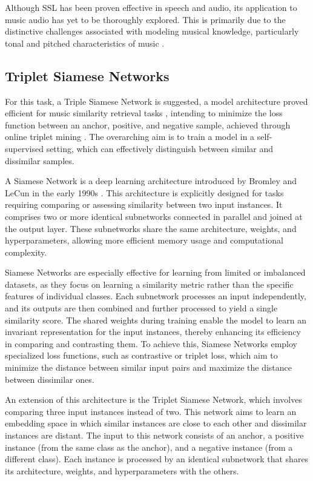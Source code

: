 Although SSL has been proven effective in speech and audio, its
application to music audio has yet to be thoroughly explored. This is primarily due
to the distinctive challenges associated with modeling musical knowledge, particularly tonal and pitched characteristics of music \cite{Li2023MERT:Training}.

\subsection{Triplet Siamese Networks}

For this task, a Triple Siamese Network is suggested, a model architecture proved efficient for music similarity retrieval tasks \cite{contentmusicsimtriplet2020}, intending to minimize the loss function between an anchor, positive, and negative sample, achieved through online triplet mining \cite{Sikaroudi2020OfflinePatches}. The overarching aim is to train a model in a self-supervised setting, which can effectively distinguish between similar and dissimilar samples. 

A Siamese Network is a deep learning architecture introduced by Bromley and LeCun in the early 1990s \cite{Bromley1993SignatureNetwork}. This architecture is explicitly designed for tasks requiring comparing or assessing similarity between two input instances. It comprises two or more identical subnetworks connected in parallel and joined at the output layer. These subnetworks share the same architecture, weights, and hyperparameters, allowing more efficient memory usage and computational complexity.

Siamese Networks are especially effective for learning from limited or imbalanced datasets, as they focus on learning a similarity metric rather than the specific features of individual classes. Each subnetwork processes an input independently, and its outputs are then combined and further processed to yield a single similarity score. The shared weights during training enable the model to learn an invariant representation for the input instances, thereby enhancing its efficiency in comparing and contrasting them. To achieve this, Siamese Networks employ specialized loss functions, such as contrastive or triplet loss, which aim to minimize the distance between similar input pairs and maximize the distance between dissimilar ones.

An extension of this architecture is the Triplet Siamese Network, which involves comparing three input instances instead of two. This network aims to learn an embedding space in which similar instances are close to each other and dissimilar instances are distant. The input to this network consists of an anchor, a positive instance (from the same class as the anchor), and a negative instance (from a different class). Each instance is processed by an identical subnetwork that shares its architecture, weights, and hyperparameters with the others.

